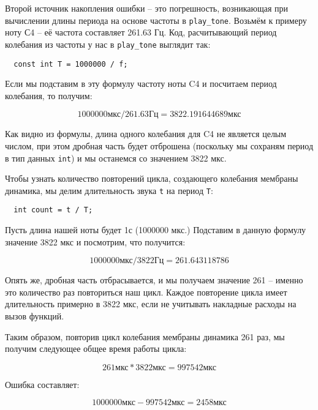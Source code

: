 \documentclass[../sparc.tex]{subfiles}
\begin{document}
Второй источник накопления ошибки -- это погрешность, возникающая при вычислении
длины периода на основе частоты в \texttt{play\_tone}.  Возьмём к примеру ноту
С4 -- её частота составляет 261.63 Гц.  Код, расчитывающий период колебания из
частоты у нас в \texttt{play\_tone} выглядит так:

\begin{verbatim}
  const int T = 1000000 / f;
\end{verbatim}

Если мы подставим в эту формулу частоту ноты C4 и посчитаем период колебания, то
получим:

\begin{equation}
  1000000 \mbox{мкс} / 261.63 \mbox{Гц} = 3822.191644689 \mbox{мкс}
\end{equation}

Как видно из формулы, длина одного колебания для C4 не является целым числом,
при этом дробная часть будет отброшена (поскольку мы сохраням период в тип
данных \texttt{int}) и мы останемся со значением 3822 мкс.

Чтобы узнать количество повторений цикла, создающего колебания мембраны
динамика, мы делим длительность звука \texttt{t} на период \texttt{T}:

\begin{verbatim}
  int count = t / T;
\end{verbatim}

Пусть длина нашей ноты будет 1с (1000000 мкс.)  Подставим в данную формулу
значение 3822 мкс и посмотрим, что получится:

\begin{equation}
  1000000 \mbox{мкс} / 3822 \mbox{Гц} = 261.643118786
\end{equation}

Опять же, дробная часть отбрасывается, и мы получаем значение 261 -- именно это
количество раз повториться наш цикл.  Каждое повторение цикла имеет длительность
примерно в 3822 мкс, если не учитывать накладные расходы на вызов функций.

Таким образом, повторив цикл колебания мембраны динамика 261 раз, мы получим
следующее общее время работы цикла:

\begin{equation}
  261 \mbox{мкс} * 3822 \mbox{мкс} = 997542 \mbox{мкс}
\end{equation}

Ошибка составляет:

\begin{equation}
  1000000 \mbox{мкс} - 997542 \mbox{мкс} = 2458 \mbox{мкс}
\end{equation}
\end{document}
